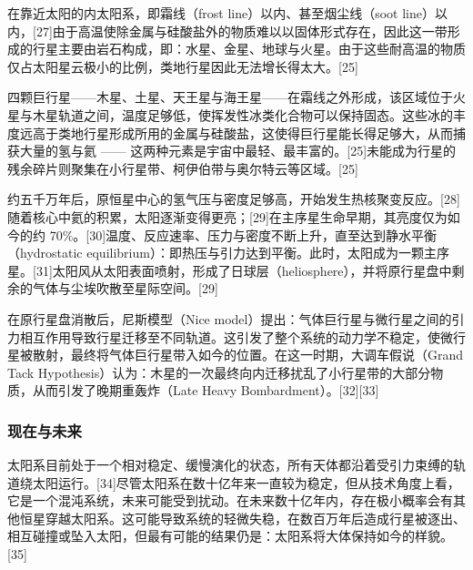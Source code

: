 在靠近太阳的内太阳系，即霜线（frost line）以内、甚至烟尘线（soot line）以内，[27]由于高温使除金属与硅酸盐外的物质难以以固体形式存在，因此这一带形成的行星主要由岩石构成，即：水星、金星、地球与火星。由于这些耐高温的物质仅占太阳星云极小的比例，类地行星因此无法增长得太大。[25]

四颗巨行星——木星、土星、天王星与海王星——在霜线之外形成，该区域位于火星与木星轨道之间，温度足够低，使挥发性冰类化合物可以保持固态。这些冰的丰度远高于类地行星形成所用的金属与硅酸盐，这使得巨行星能长得足够大，从而捕获大量的氢与氦 —— 这两种元素是宇宙中最轻、最丰富的。[25]未能成为行星的残余碎片则聚集在小行星带、柯伊伯带与奥尔特云等区域。[25]

约五千万年后，原恒星中心的氢气压与密度足够高，开始发生热核聚变反应。[28]随着核心中氦的积累，太阳逐渐变得更亮；[29]在主序星生命早期，其亮度仅为如今的约 70\%。[30]温度、反应速率、压力与密度不断上升，直至达到静水平衡（hydrostatic equilibrium）：即热压与引力达到平衡。此时，太阳成为一颗主序星。[31]太阳风从太阳表面喷射，形成了日球层（heliosphere），并将原行星盘中剩余的气体与尘埃吹散至星际空间。[29]

在原行星盘消散后，尼斯模型（Nice model）提出：气体巨行星与微行星之间的引力相互作用导致行星迁移至不同轨道。这引发了整个系统的动力学不稳定，使微行星被散射，最终将气体巨行星带入如今的位置。在这一时期，大调车假说（Grand Tack Hypothesis）认为：木星的一次最终向内迁移扰乱了小行星带的大部分物质，从而引发了晚期重轰炸（Late Heavy Bombardment）。[32][33]
\subsubsection{现在与未来}
太阳系目前处于一个相对稳定、缓慢演化的状态，所有天体都沿着受引力束缚的轨道绕太阳运行。[34]尽管太阳系在数十亿年来一直较为稳定，但从技术角度上看，它是一个混沌系统，未来可能受到扰动。在未来数十亿年内，存在极小概率会有其他恒星穿越太阳系。这可能导致系统的轻微失稳，在数百万年后造成行星被逐出、相互碰撞或坠入太阳，但最有可能的结果仍是：太阳系将大体保持如今的样貌。[35]


